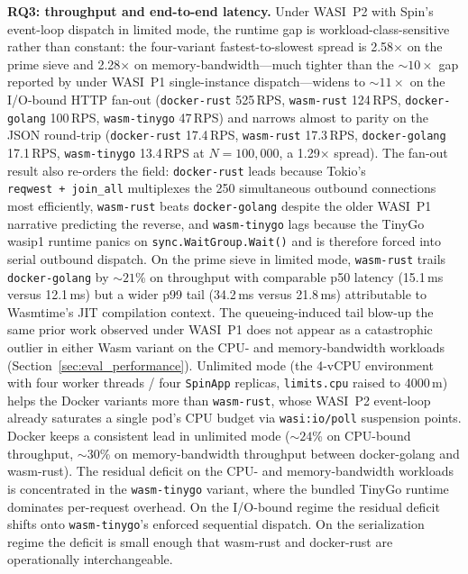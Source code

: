 \begin{sloppypar}
\textbf{RQ3: throughput and end-to-end latency.} Under \acs{WASI}~P2 with Spin's event-loop dispatch in limited mode, the runtime gap is workload-class-sensitive rather than constant: the four-variant fastest-to-slowest spread is 2.58$\times$ on the prime sieve and 2.28$\times$ on memory-bandwidth---much tighter than the ${\sim}10\times$ gap reported by \textcite{sondell2024performance} under \acs{WASI}~P1 single-instance dispatch---widens to ${\sim}11\times$ on the I/O-bound HTTP fan-out (\texttt{docker-rust} 525\,RPS, \texttt{wasm-rust} 124\,RPS, \texttt{docker-golang} 100\,RPS, \texttt{wasm-tinygo} 47\,RPS) and narrows almost to parity on the \acs{JSON} round-trip (\texttt{docker-rust} 17.4\,RPS, \texttt{wasm-rust} 17.3\,RPS, \texttt{docker-golang} 17.1\,RPS, \texttt{wasm-tinygo} 13.4\,RPS at $N=100{,}000$, a 1.29$\times$ spread). The fan-out result also re-orders the field: \texttt{docker-rust} leads because Tokio's \texttt{reqwest~+~join\_all} multiplexes the 250 simultaneous outbound connections most efficiently, \texttt{wasm-rust} beats \texttt{docker-golang} despite the older WASI~P1 narrative predicting the reverse, and \texttt{wasm-tinygo} lags because the TinyGo wasip1 runtime panics on \texttt{sync.WaitGroup.Wait()} and is therefore forced into serial outbound dispatch. On the prime sieve in limited mode, \texttt{wasm-rust} trails \texttt{docker-golang} by ${\sim}21$\% on throughput with comparable p50 latency (15.1\,ms versus 12.1\,ms) but a wider p99 tail (34.2\,ms versus 21.8\,ms) attributable to Wasmtime's \acs{JIT} compilation context. The queueing-induced tail blow-up the same prior work observed under \acs{WASI}~P1 does not appear as a catastrophic outlier in either Wasm variant on the CPU- and memory-bandwidth workloads (Section~\ref{sec:eval_performance}). Unlimited mode (the 4-vCPU environment with four worker threads / four \texttt{SpinApp} replicas, \texttt{limits.cpu} raised to 4000\,m) helps the Docker variants more than \texttt{wasm-rust}, whose \acs{WASI}~P2 event-loop already saturates a single pod's \acs{CPU} budget via \texttt{wasi:io/poll} suspension points. Docker keeps a consistent lead in unlimited mode (${\sim}24$\% on \acs{CPU}-bound throughput, ${\sim}30$\% on memory-bandwidth throughput between docker-golang and wasm-rust). The residual deficit on the CPU- and memory-bandwidth workloads is concentrated in the \texttt{wasm-tinygo} variant, where the bundled TinyGo runtime dominates per-request overhead. On the I/O-bound regime the residual deficit shifts onto \texttt{wasm-tinygo}'s enforced sequential dispatch. On the serialization regime the deficit is small enough that wasm-rust and docker-rust are operationally interchangeable.
\end{sloppypar}

